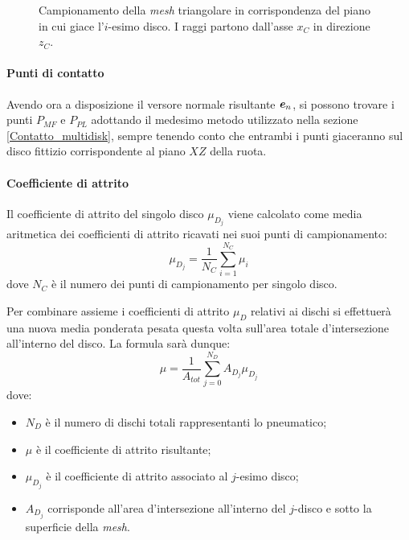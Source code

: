 \begin{figure}
	\centering
	\caption{Campionamento della \textit{mesh} triangolare in corrispondenza del piano in cui giace l'$i$-esimo disco. I raggi partono dall'asse $x_C$ in direzione $z_C$.}
\end{figure}

\paragraph{Punti di contatto}
Avendo ora a disposizione il versore normale risultante $\textbf{\textit{e}}_n$, si possono trovare i punti $P_{MF}$ e $P_{PL}$ adottando il medesimo metodo utilizzato nella sezione \ref{Contatto_multidisk}, sempre tenendo conto che entrambi i punti giaceranno sul disco fittizio corrispondente al piano $XZ$ della ruota.

\paragraph{Coefficiente di attrito}
Il coefficiente di attrito del singolo disco $\mu_{D_j}$ viene calcolato come media aritmetica dei coefficienti di attrito ricavati nei suoi punti di campionamento:
%
\begin{equation}
\mu_{D_j} = \frac{1}{N_C}\sum_{i=1}^{N_C}\mu_i
\end{equation}
dove $N_C$ è il numero dei punti di campionamento per singolo disco.

Per combinare assieme i coefficienti di attrito $\mu_D$ relativi ai dischi si effettuerà una nuova media ponderata pesata questa volta sull'area totale d'intersezione all'interno del disco. La formula sarà dunque:
%
\begin{equation}
\mu = \frac{1}{A_{tot}}\sum_{j=0}^{N_D}A_{D_j}\mu_{D_j}
\end{equation}
%
dove:
\begin{itemize}
	\item $N_D$ è il numero di dischi totali rappresentanti lo pneumatico;
	\item $\mu$ è il coefficiente di attrito risultante;
	\item $\mu_{D_j}$ è il coefficiente di attrito associato al $j$-esimo disco;
	\item $A_{D_j}$ corrisponde all'area d'intersezione all'interno del $j$-disco e sotto la superficie della \textit{mesh}.
\end{itemize}
